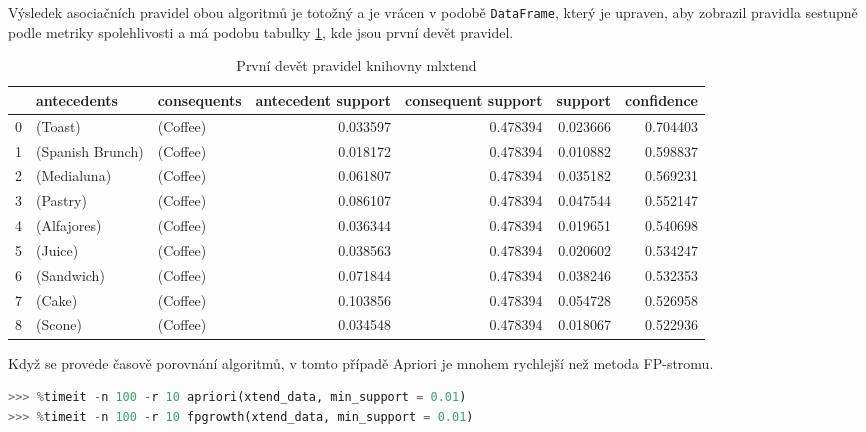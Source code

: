 Výsledek asociačních pravidel obou algoritmů je totožný a je vrácen v podobě \verb|DataFrame|, který je upraven, aby zobrazil pravidla sestupně podle metriky spolehlivosti a má podobu tabulky \ref{tab3}, kde jsou první devět pravidel.

\begin{table}[]
    \centering
    \begin{adjustbox}{width=\linewidth,center}
    \begin{tabular}{lllrrrr}
\toprule
{} &       antecedents & consequents &  antecedent support &  consequent support &   support &  confidence \\
\midrule
0 &           (Toast) &    (Coffee) &   0.033597 &            0.478394 &  0.023666 &    0.704403 \\
1 &  (Spanish Brunch) &    (Coffee) &   0.018172 &            0.478394 &  0.010882 &    0.598837 \\
2 &       (Medialuna) &    (Coffee) &   0.061807 &            0.478394 &  0.035182 &    0.569231 \\
3 &          (Pastry) &    (Coffee) &   0.086107 &            0.478394 &  0.047544 &    0.552147 \\
4 &       (Alfajores) &    (Coffee) &   0.036344 &            0.478394 &  0.019651 &    0.540698 \\
5 &           (Juice) &    (Coffee) &   0.038563 &            0.478394 &  0.020602 &    0.534247 \\
6 &        (Sandwich) &    (Coffee) &   0.071844 &            0.478394 &  0.038246 &    0.532353 \\
7 &            (Cake) &    (Coffee) &   0.103856 &            0.478394 &  0.054728 &    0.526958 \\
8 &           (Scone) &    (Coffee) &   0.034548 &            0.478394 &  0.018067 &    0.522936 \\
\bottomrule
\end{tabular}
\end{adjustbox}
    \caption{První devět pravidel knihovny mlxtend}
    \label{tab3}
\end{table}

Když se provede časově porovnání algoritmů, v tomto případě Apriori je mnohem rychlejší než metoda FP-stromu.

\begin{mdframed}
\begin{lstlisting}[language=Python]
>>> %timeit -n 100 -r 10 apriori(xtend_data, min_support = 0.01)
>>> %timeit -n 100 -r 10 fpgrowth(xtend_data, min_support = 0.01)
\end{lstlisting}   
\end{mdframed}

